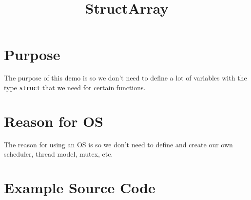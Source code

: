 \documentclass{article}
\title{StructArray}
\author{}
\date{}
\begin{document}
\maketitle

\section*{Purpose}
The purpose of this demo is so we don't need to define a lot of variables with the type \texttt{struct} that we need for certain functions.

\section*{Reason for OS}
The reason for using an OS is so we don't need to define and create our own scheduler, thread model, mutex, etc.

\section*{Example Source Code}
\end{document}
